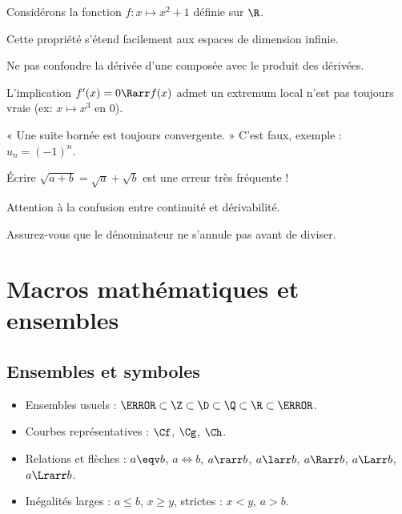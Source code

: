 \documentclass{poly}
\begin{document}
\begin{ex}
	Considérons la fonction $f: x \mapsto x^2 + 1$ définie sur $\R$.
\end{ex}

\begin{rmq}
	Cette propriété s'étend facilement aux espaces de dimension infinie.
\end{rmq}

\begin{attention}
	Ne pas confondre la dérivée d'une composée avec le produit des dérivées.
\end{attention}

\begin{piege}
	L'implication $f'(x) = 0 \Rarr f(x)$ admet un extremum local n'est pas toujours vraie (ex: $x \mapsto x^3$ en 0).
\end{piege}

\begin{ideerecue}
	« Une suite bornée est toujours convergente. » C'est faux, exemple : $u_n = (-1)^n$.
\end{ideerecue}

\begin{erreur}
	Écrire $\sqrt{a+b} = \sqrt{a} + \sqrt{b}$ est une erreur très fréquente !
\end{erreur}

\begin{fauxami}
	Attention à la confusion entre continuité et dérivabilité.
\end{fauxami}

\begin{miseengarde}
	Assurez-vous que le dénominateur ne s'annule pas avant de diviser.
\end{miseengarde}

\section{Macros mathématiques et ensembles}

\subsection{Ensembles et symboles}
\begin{itemize}
	\item Ensembles usuels : $\N \subset \Z \subset \D \subset \Q \subset \R \subset \C$.
	\item Courbes représentatives : $\Cf$, $\Cg$, $\Ch$.
	\item Relations et flèches : $a \eqv b$, $a \iff b$, $a \rarr b$, $a \larr b$, $a \Rarr b$, $a \Larr b$, $a \Lrarr b$.
	\item Inégalités larges : $a \leq b$, $x \geq y$, strictes : $x \lt y$, $a \gt b$.
\end{itemize}
\end{document}
